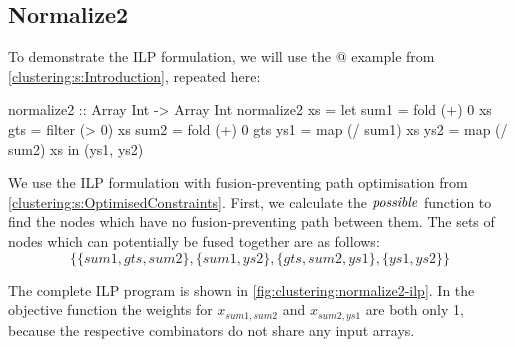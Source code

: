 \subsection{Normalize2}
To demonstrate the ILP formulation, we will use the @ example from \cref{clustering:s:Introduction}, repeated here:
\begin{haskell}
normalize2 :: Array Int -> Array Int
normalize2 xs
 = let sum1 = fold   (+)  0   xs
       gts  = filter (>   0)  xs
       sum2 = fold   (+)  0   gts
       ys1  = map    (/ sum1) xs
       ys2  = map    (/ sum2) xs
   in (ys1, ys2)
\end{haskell}

We use the ILP formulation with fusion-preventing path optimisation from \cref{clustering:s:OptimisedConstraints}.
First, we calculate the $\mathit{possible}$ function to find the nodes which have no fusion-preventing path between them.
The sets of nodes which can potentially be fused together are as follows:
\[ \{ \{sum1, gts, sum2\}
 , \{sum1, ys2\}
 , \{gts, sum2, ys1\}
 , \{ys1, ys2\} \} \]

The complete ILP program is shown in \cref{fig:clustering:normalize2-ilp}.
In the objective function the weights for $x_{sum1, sum2}$ and $x_{sum2, ys1}$ are both only 1, because the respective combinators do not share any input arrays.

